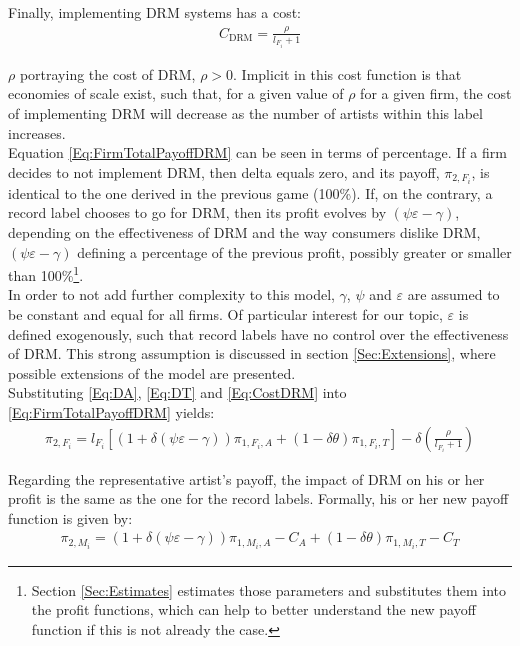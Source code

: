 \documentclass[letter,12pt]{article}
\numberwithin{equation}{section}
\newcommand{\drm}{\text{DRM}}
\newcommand{\artistpayoff}[2]{\pi_{#1, M_{#2}}}
\newcommand{\firmpayoff}[2]{\pi_{{#1}, F_{#2}}}
\newcommand{\artistalbum}[2]{\pi_{#1, M_{#2}, A}}
\newcommand{\artistticket}[2]{\pi_{#1, M_{#2}, T}}
\newcommand{\firmalbum}[2]{\pi_{#1, F_{#2}, A}}
\newcommand{\firmticket}[2]{\pi_{#1, F_{#2}, T}}
\newcommand{\drminf}{(\psi \varepsilon - \gamma)}
\begin{document}
Finally, implementing DRM systems has a cost:
\begin{eqnarray}
C_\drm = \frac{\rho}{l_{F_i} + 1}
\label{Eq:CostDRM}
\end{eqnarray}

$\rho$ portraying the cost of DRM, $\rho > 0$. Implicit in this cost function is that economies of scale exist, such that, for a given value of $\rho$ for a given firm, the cost of implementing DRM will decrease as the number of artists within this label increases.\\

Equation \eqref{Eq:FirmTotalPayoffDRM} can be seen in terms of percentage. If a firm decides to not implement DRM, then delta equals zero, and its payoff, $\firmpayoff{2}{i}$, is identical to the one derived in the previous game (100\%). If, on the contrary, a record label chooses to go for DRM, then its profit evolves by $\drminf$, depending on the effectiveness of DRM and the way consumers dislike DRM, $\drminf$ defining a percentage of the previous profit, possibly greater or smaller than 100\%\footnote {
Section \ref{Sec:Estimates} estimates those parameters and substitutes them into the profit functions, which can help to better understand the new payoff function if this is not already the case.
}.\\

In order to not add further complexity to this model, $\gamma$, $\psi$ and $\varepsilon$ are assumed to be constant and equal for all firms. Of particular interest for our topic, $\varepsilon$ is defined exogenously, such that record labels have no control over the effectiveness of DRM. This strong assumption is discussed in section \ref{Sec:Extensions}, where possible extensions of the model are presented.\\

Substituting \eqref{Eq:DA}, \eqref{Eq:DT} and \eqref{Eq:CostDRM} into \eqref{Eq:FirmTotalPayoffDRM} yields:
\begin{eqnarray}
\firmpayoff{2}{i} = l_{F_i} \left[
	(1 + \delta \drminf) \firmalbum{1}{i} +
	(1 - \delta \theta) \firmticket{1}{i}
\right]
- \delta \left( \frac{\rho}{l_{F_i} + 1} \right)
\end{eqnarray}

Regarding the representative artist’s payoff, the impact of DRM on his or her profit is the same as the one for the record labels. Formally, his or her new payoff function is given by:
\begin{eqnarray}
\artistpayoff{2}{i} = (1 + \delta \drminf) \artistalbum{1}{i} - C_A +
						(1 - \delta \theta) \artistticket{1}{i} - C_T
\end{eqnarray}
\end{document}
